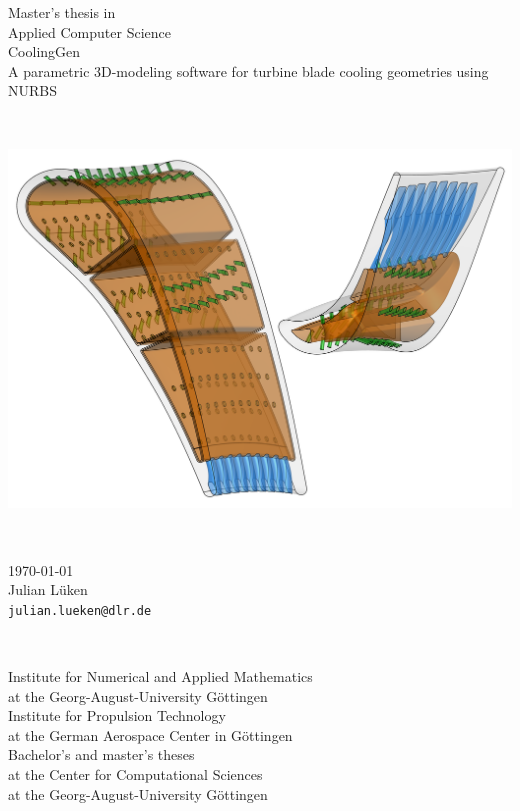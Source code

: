 \documentclass[a4paper, 11pt]{report}
\theoremstyle{definition}
\newcommand{\mytitle}[1]{\LARGE{#1}\normalsize}
\newcommand{\titlespace}{1em}
\newcommand{\largetitlespace}{2.5em}
\newcommand{\titlefigurespace}{3.5em}
\begin{document}
\begin{titlepage}
\begin{center}
\begin{minipage}{.49\textwidth}
			\begin{center}
				Master's thesis in\\
				Applied Computer Science\\[\titlespace]
				\mytitle{CoolingGen}\\[0.5\titlespace]
				A parametric 3D-modeling software for turbine blade cooling geometries using NURBS
			\end{center}
		\end{minipage}\\[\titlefigurespace]
		\begin{minipage}{.6\textwidth}
			\includegraphics[width=\textwidth]{../tec/complete/title.png}
		\end{minipage}\\[\titlefigurespace]
		\begin{minipage}{.6\textwidth}
			\centering
				\today\\
				Julian Lüken\\
				\texttt{julian.lueken@dlr.de}
		\end{minipage}\\[\largetitlespace]
		\begin{minipage}{.5\textwidth}
			\centering
			Institute for Numerical and Applied Mathematics\\at the Georg-August-University Göttingen\\[\titlespace]
			Institute for Propulsion Technology\\at the German Aerospace Center in Göttingen\\[\titlespace]
			Bachelor's and master's theses\\at the Center for Computational Sciences\\at the Georg-August-University Göttingen\\[\titlespace]

\end{minipage}
\end{center}
\end{titlepage}
\end{document}
